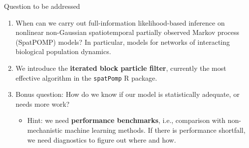 \documentclass{beamer}
\begin{document}
\begin{frame}{Question to be addressed}

  \begin{enumerate}
  \item When can we carry out full-information likelihood-based inference on nonlinear non-Gaussian spatiotemporal partially observed Markov process (SpatPOMP) models? In particular, models for networks of interacting biological population dynamics.

        \vspace{2mm}

\item We introduce the {\bf iterated block particle filter}, currently the most effective algorithm in the \texttt{spatPomp} R package.

\vspace{2mm}

\item Bonus question: How do we know if our model is statistically adequate, or needs more work?

  \begin{itemize}
  \item Hint: we need {\bf performance benchmarks}, i.e., comparison with non-mechanistic machine learning methods. If there is performance shortfall, we need diagnostics to figure out where and how.
  \end{itemize}
    \end{enumerate}
\end{frame}

\newcommand\challengeSep{\vspace{3mm}}
\end{document}
